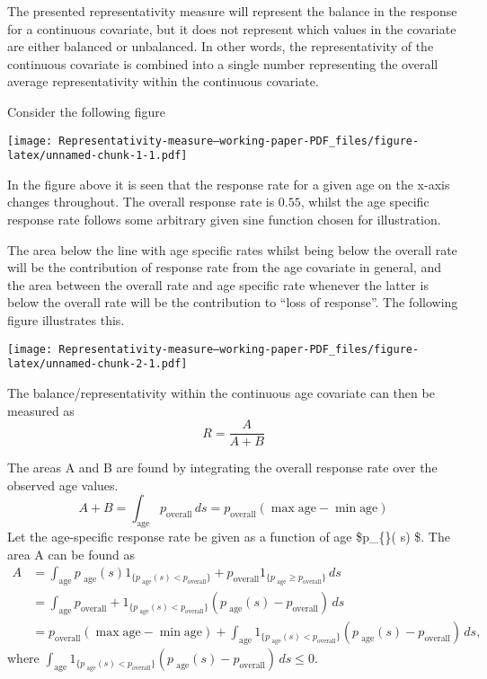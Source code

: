 \documentclass[
]{article}
\begin{document}
The presented representativity measure will represent the balance in the
response for a continuous covariate, but it does not represent which
values in the covariate are either balanced or unbalanced. In other
words, the representativity of the continuous covariate is combined into
a single number representing the overall average representativity within
the continuous covariate.

Consider the following figure

\texttt{[image: Representativity-measure---working-paper-PDF\_files/figure-latex/unnamed-chunk-1-1.pdf]}

In the figure above it is seen that the response rate for a given age on
the x-axis changes throughout. The overall response rate is \(0.55\),
whilst the age specific response rate follows some arbitrary given sine
function chosen for illustration.

The area below the line with age specific rates whilst being below the
overall rate will be the contribution of response rate from the age
covariate in general, and the area between the overall rate and age
specific rate whenever the latter is below the overall rate will be the
contribution to ``loss of response''. The following figure illustrates
this.

\texttt{[image: Representativity-measure---working-paper-PDF\_files/figure-latex/unnamed-chunk-2-1.pdf]}

The balance/representativity within the continuous age covariate can
then be measured as \[
R = \frac{A}{A+B}
\]

The areas A and B are found by integrating the overall response rate
over the observed age values. \[
A+B = \int_{\text{age}} p_{\text{overall}} \, ds =  p_{\text{overall}} \left( \max \text{age} - \min \text{age} \right)
\] Let the age-specific response rate be given as a function of age
\$p\_\{\}( s) \$. The area A can be found as \begin{align}
A & = \int_{\text{age}} p_{\text{ age}}( s) 1_{ \{  p_{\text{ age}}( s) < p_{\text{overall}} \} } +  p_{\text{overall}} 1_{ \{  p_{\text{ age}} \geq p_{\text{overall}} \} } \, ds \\
&= \int_{\text{age}} p_{\text{overall}}+1_{ \{  p_{\text{ age}}( s) < p_{\text{overall}} \} }\left(p_{\text{ age}}( s) - p_{\text{overall}}  \right)  \, ds \\
&= p_{\text{overall}} \left( \max \text{age} - \min \text{age} \right) + 
\int_{\text{age}}1_{ \{  p_{\text{ age}}( s) < p_{\text{overall}} \} }\left(p_{\text{ age}}( s) - p_{\text{overall}}  \right)  \, ds,
\end{align} where
\(\int_{\text{age}}1_{ \{ p_{\text{ age}}( s) < p_{\text{overall}} \} }\left(p_{\text{ age}}( s) - p_{\text{overall}} \right) \, ds \leq 0\).
\end{document}

